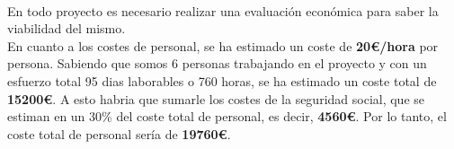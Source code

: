 \documentclass{report}
\begin{document}
        \paragraph*{}
        {
            En todo proyecto es necesario realizar una evaluación económica para saber la viabilidad del mismo.\\

            En cuanto a los costes de personal, se ha estimado un coste de \textbf{20€/hora} por persona.
            Sabiendo que somos 6 personas trabajando en el proyecto y con un esfuerzo total 95 dias laborables o 760 horas, se ha estimado un coste total de \textbf{15200€}.
            A esto habria que sumarle los costes de la seguridad social, que se estiman en un 30\% del coste total de personal, es decir, \textbf{4560€}.
            Por lo tanto, el coste total de personal sería de \textbf{19760€}.\\

}
\end{document}
